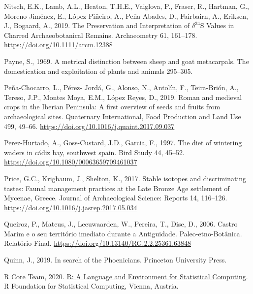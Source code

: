 \documentclass[preprint, 3p, authoryear]{elsarticle} %
\newlength{\cslhangindent}
\newlength{\cslentryspacingunit} %
\newenvironment{CSLReferences}[2] %
 {%
  \setlength{\parindent}{0pt}
  \ifodd #1
  \let\oldpar\par
  \def\par{\hangindent=\cslhangindent\oldpar}
  \fi
  \setlength{\parskip}{#2\cslentryspacingunit}
 }%
 {}
\begin{document}
\begin{CSLReferences}{1}{0}
\leavevmode{}%
Nitsch, E.K., Lamb, A.L., Heaton, T.H.E., Vaiglova, P., Fraser, R., Hartman, G., Moreno-Jiménez, E., López-Piñeiro, A., Peña-Abades, D., Fairbairn, A., Eriksen, J., Bogaard, A., 2019. The {Preservation} and {Interpretation} of {\(\delta^{34}\)S Values} in {Charred Archaeobotanical Remains}. Archaeometry 61, 161--178. \url{https://doi.org/10.1111/arcm.12388}

\leavevmode{}%
Payne, S., 1969. A metrical distinction between sheep and goat metacarpals. The domestication and exploitation of plants and animals 295--305.

\leavevmode{}%
Peña-Chocarro, L., Pérez- Jordá, G., Alonso, N., Antolín, F., Teira-Brión, A., Tereso, J.P., Montes Moya, E.M., López Reyes, D., 2019. Roman and medieval crops in the {Iberian Peninsula}: {A} first overview of seeds and fruits from archaeological sites. Quaternary International, Food {Production} and {Land Use} 499, 49--66. \url{https://doi.org/10.1016/j.quaint.2017.09.037}

\leavevmode{}%
Perez-Hurtado, A., Goss-Custard, J.D., Garcia, F., 1997. The diet of wintering waders in cádiz bay, southwest spain. Bird Study 44, 45--52. \url{https://doi.org/10.1080/00063659709461037}

\leavevmode{}%
Price, G.C., Krigbaum, J., Shelton, K., 2017. Stable isotopes and discriminating tastes: {Faunal} management practices at the {Late Bronze Age} settlement of {Mycenae}, {Greece}. Journal of Archaeological Science: Reports 14, 116--126. \url{https://doi.org/10.1016/j.jasrep.2017.05.034}

\leavevmode{}%
Queiroz, P., Mateus, J., Leeuwaarden, W., Pereira, T., Dise, D., 2006. Castro {Marim} e o seu território imediato durante a {Antiguidade}. {Paleo}-etno-{Botânica}. {Relatório Final}. \url{https://doi.org/10.13140/RG.2.2.25361.63848}

\leavevmode{}%
Quinn, J., 2019. In search of the {Phoenicians}. {Princeton University Press}.

\leavevmode{}%
R Core Team, 2020. \href{https://www.R-project.org/}{R: {A Language} and {Environment} for {Statistical Computing}}. {R Foundation for Statistical Computing}, {Vienna, Austria}.


\end{CSLReferences}
\end{document}

